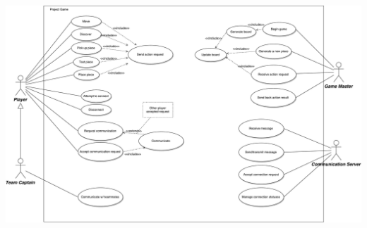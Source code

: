 \documentclass[11pt]{article}
\begin{document}
\hspace*{-4cm}
\resizebox{1.5\textwidth}{!}
{
\includegraphics{../res/usecase}
}
\FloatBarrier
\end{document}
